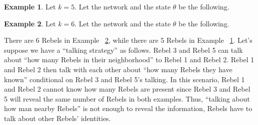 \documentclass[12pt,letterpaper]{article}
\newtheorem*{main result}{Main Result}
\theoremstyle{definition}
\newtheorem{example}{Example}[section]
\theoremstyle{remark}
\theoremstyle{claim}
\begin{document}
\begin{example}\label{ex_cycle_number_5}
Let $k=5$. Let the network and the state $\theta$ be the following.

\begin{center} 
\end{center} 

\end{example}


\begin{example}\label{ex_cycle_number_6}
Let $k=6$. Let the network and the state $\theta$ be the following.
\begin{center} 
\end{center} 


\end{example}

There are 6 Rebels in Example ~\ref{ex_cycle_number_6}, while there are 5 Rebels in Example ~\ref{ex_cycle_number_5}. Let's suppose we have a ``talking strategy'' as follows. Rebel 3 and Rebel 5 can talk about ``how many Rebels in their neighborhood'' to Rebel 1 and Rebel 2. Rebel 1 and Rebel 2 then talk with each other about ``how many Rebels they have known'' conditional on Rebel 3 and Rebel 5's talking. In this scenario, Rebel 1 and Rebel 2 cannot know how many Rebels are present since Rebel 3 and Rebel 5 will reveal the same number of Rebels in both examples. Thus, ``talking about how man nearby Rebels'' is not enough to reveal the information, Rebels have to talk about other Rebels' identities. 
\end{document}
